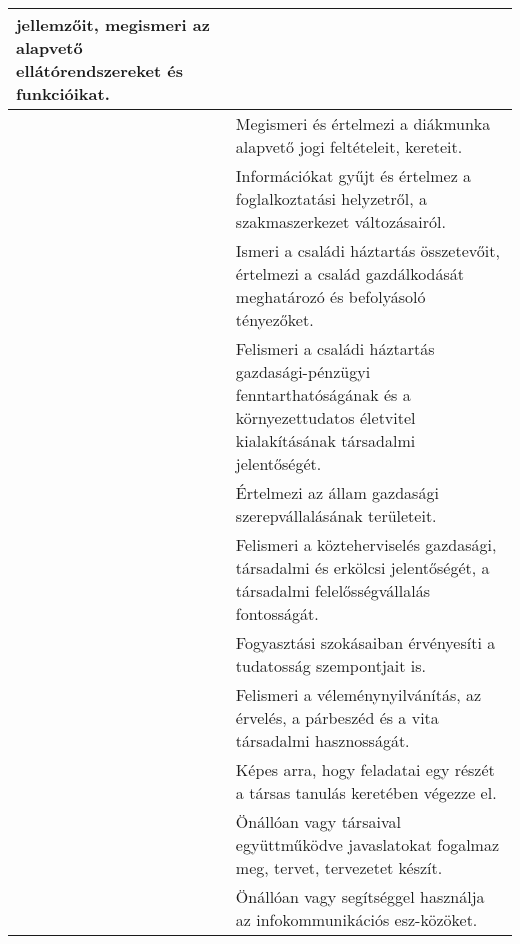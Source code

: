 \begin{longtable}[]{p{\evflength}@{\strut}>{\begin{minipage}{\columnlength}\strut}l<{\strut\end{minipage}}}
  jellemzőit, megismeri az alapvető ellátórendszereket és funkcióikat.
\tabularnewline
\hline
&
  Megismeri és értelmezi a diákmunka alapvető jogi feltételeit,
  kereteit.
\tabularnewline
\hline
&
  Információkat gyűjt és értelmez a foglalkoztatási helyzetről, a
  szakmaszerkezet változásairól.
\tabularnewline
\hline
&
  Ismeri a családi háztartás összetevőit, értelmezi a család
  gazdálkodását meghatározó és befolyásoló tényezőket.
\tabularnewline
\hline
&
  Felismeri a családi háztartás gazdasági-pénzügyi fenntarthatóságának
  és a környezettudatos életvitel kialakításának társadalmi
  jelentőségét.
\tabularnewline
\hline
&
  Értelmezi az állam gazdasági szerepvállalásának területeit.
\tabularnewline
\hline
&
  Felismeri a közteherviselés gazdasági, társadalmi és erkölcsi
  jelentőségét, a társadalmi felelősségvállalás fontosságát.
\tabularnewline
\hline
&
  Fogyasztási szokásaiban érvényesíti a tudatosság szempontjait is.
\tabularnewline
\hline
&
  Felismeri a véleménynyilvánítás, az érvelés, a párbeszéd és a vita
  társadalmi hasznosságát.
\tabularnewline
\hline
&
  Képes arra, hogy feladatai egy részét a társas tanulás keretében
  végezze el.
\tabularnewline
\hline
&
  Önállóan vagy társaival együttműködve javaslatokat fogalmaz meg,
  tervet, tervezetet készít.
\tabularnewline
\hline
&
  Önállóan vagy segítséggel használja az infokommunikációs esz-\break közöket.
\tabularnewline
\hline
\end{longtable}



